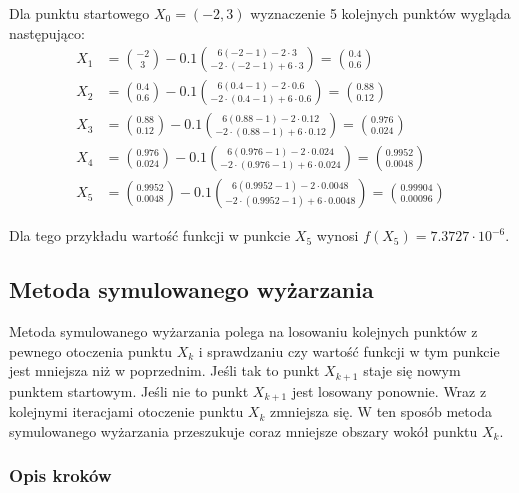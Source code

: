 \documentclass{article}
\begin{document}
Dla punktu startowego $X_0 = (-2, 3)$
wyznaczenie 5 kolejnych punktów wygląda następująco:
\begin{equation*}
    \begin{aligned}
    X_1 &= {{-2} \choose {3}} - 0.1 {6(-2 - 1)-2\cdot3 \choose -2\cdot(-2-1)+6\cdot3} = {{0.4} \choose {0.6}} \\
    X_2 &= {{0.4} \choose {0.6}} - 0.1 {6(0.4 - 1)-2\cdot0.6 \choose -2\cdot(0.4-1)+6\cdot0.6} = {{0.88} \choose {0.12}} \\
    X_3 &= {{0.88} \choose {0.12}} - 0.1 {6(0.88 - 1)-2\cdot0.12 \choose -2\cdot(0.88-1)+6\cdot0.12} = {{0.976} \choose {0.024}} \\
    X_4 &= {{0.976} \choose {0.024}} - 0.1 {6(0.976 - 1)-2\cdot0.024 \choose -2\cdot(0.976-1)+6\cdot0.024} = {{0.9952} \choose {0.0048}} \\
    X_5 &= {{0.9952} \choose {0.0048}} - 0.1 {6(0.9952 - 1)-2\cdot0.0048 \choose -2\cdot(0.9952-1)+6\cdot0.0048} = {{0.99904} \choose {0.00096}}
    \end{aligned}
\end{equation*}

Dla tego przykładu wartość funkcji w punkcie $X_5$ wynosi $f(X_5) = 7.3727 \cdot 10^{-6}$.

\subsection{Metoda symulowanego wyżarzania}
Metoda symulowanego wyżarzania polega na losowaniu kolejnych punktów
z pewnego otoczenia punktu $X_k$ i sprawdzaniu czy wartość funkcji
w tym punkcie jest mniejsza niż w poprzednim. Jeśli tak to punkt
$X_{k+1}$ staje się nowym punktem startowym. Jeśli nie to punkt
$X_{k+1}$ jest losowany ponownie. Wraz z kolejnymi iteracjami
otoczenie punktu $X_k$ zmniejsza się. W ten sposób metoda
symulowanego wyżarzania przeszukuje coraz mniejsze obszary
wokół punktu $X_k$.

\subsubsection{Opis kroków}
\end{document}

